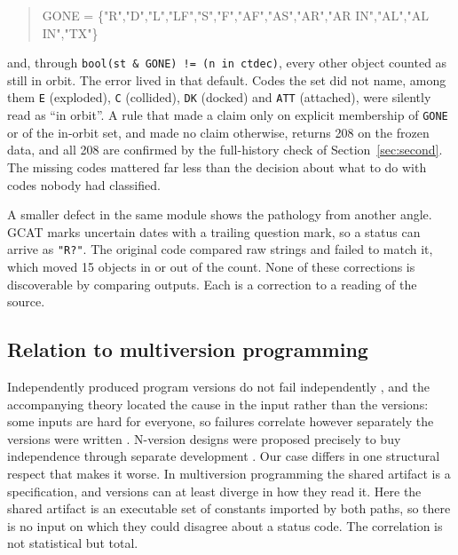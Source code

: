 \begin{quote}\small\ttfamily
GONE = \{"R","D","L","LF","S","F","AF","AS","AR","AR IN","AL","AL IN","TX"\}
\end{quote}

\noindent and, through \texttt{bool(st \& GONE) != (n in ctdec)}, every other
object counted as still in orbit. The error lived in that default. Codes the set
did not name, among them \texttt{E} (exploded), \texttt{C} (collided),
\texttt{DK} (docked) and \texttt{ATT} (attached), were silently read as ``in
orbit''. A rule that made a claim only on explicit membership of \texttt{GONE}
or of the in-orbit set, and made no claim otherwise, returns 208 on the frozen
data, and all 208 are confirmed by the full-history check of
Section~\ref{sec:second}. The missing codes mattered far less than the decision
about what to do with codes nobody had classified.

A smaller defect in the same module shows the pathology from another angle. GCAT
marks uncertain dates with a trailing question mark, so a status can arrive as
\texttt{"R?"}. The original code compared raw strings and failed to match it,
which moved 15 objects in or out of the count. None of these corrections is
discoverable by comparing outputs. Each is a correction to a reading of the
source.

\subsection{Relation to multiversion programming}

Independently produced program versions do not fail independently
\citep{knight1986experimental}, and the accompanying theory located the cause in
the input rather than the versions: some inputs are hard for everyone, so
failures correlate however separately the versions were written
\citep{eckhardt1985theoretical, littlewood1989conceptual}. N-version designs were
proposed precisely to buy independence through separate development
\citep{avizienis1985nversion}. Our case differs in one structural respect that
makes it worse. In multiversion programming the shared artifact is a
specification, and versions can at least diverge in how they read it. Here the
shared artifact is an executable set of constants imported by both paths, so
there is no input on which they could disagree about a status code. The
correlation is not statistical but total.
